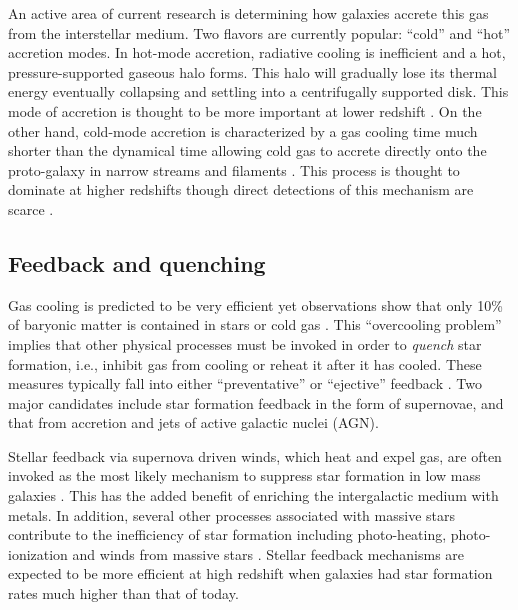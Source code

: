 An active area of current research is determining how galaxies accrete this gas from the interstellar medium. Two flavors are currently popular: ``cold'' and ``hot'' accretion modes. In hot-mode accretion, radiative cooling is inefficient and a hot, pressure-supported gaseous halo forms. This halo will gradually lose its thermal energy eventually collapsing and settling into a centrifugally supported disk.  This mode of accretion is thought to be more important at lower redshift \citep{Faucher-Giguere2011,VandeVoort2011}. On the other hand, cold-mode accretion is characterized by a gas cooling time much shorter than the dynamical time allowing cold gas to accrete directly onto the proto-galaxy in narrow streams and filaments \citep{WhiteFrenk1991, Birnboim2003,Keres2005,Dekel2009b}. This process is thought to dominate at higher redshifts \citep{Katz2003} though direct detections of this mechanism are scarce \citep{Steidel2010,Beck2016,Fumagalli2016,Martin2015,Martin2016}.


\subsection{Feedback and quenching}
\label{chap1: feedback}

Gas cooling is predicted to be very efficient yet observations show that only 10\% of baryonic matter is contained in stars or cold gas \citep{Fukugita2004}. This ``overcooling problem'' implies that other physical processes must be invoked in order to \textit{quench} star formation, i.e., inhibit gas from cooling or reheat it after it has cooled. These measures typically fall into either ``preventative'' or ``ejective'' feedback \citep{Gabor2010,Keres2009b}. Two major candidates include star formation feedback in the form of supernovae, and that from accretion and jets of active galactic nuclei (AGN).

Stellar feedback via supernova driven winds, which heat and expel gas, are often invoked as the most likely mechanism to suppress star formation in low mass galaxies \citep{DekelSilk1986,White1978}. This has the added benefit of enriching the intergalactic medium with metals. In addition, several other processes associated with massive stars contribute to the inefficiency of star formation including photo-heating, photo-ionization and winds from massive stars \citep[e.g., review by][]{Hopkins2012}. Stellar feedback mechanisms are expected to be more efficient at high redshift when galaxies had star formation rates much higher than that of today. 


